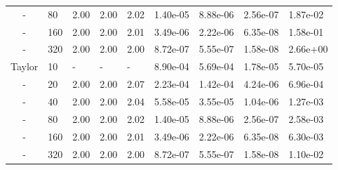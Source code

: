 \begin{table}[p]
{\begin{tabular}{cllllllll}
   - &    80 & 2.00 & 2.00 & 2.02 & 1.40e-05 & 8.88e-06 & 2.56e-07 & 1.87e-02 \\ 
   - &   160 & 2.00 & 2.00 & 2.01 & 3.49e-06 & 2.22e-06 & 6.35e-08 & 1.58e-01 \\ 
   - &   320 & 2.00 & 2.00 & 2.00 & 8.72e-07 & 5.55e-07 & 1.58e-08 & 2.66e+00 \\
   \hline
   Taylor &  10 & - & - & - & 8.90e-04 & 5.69e-04 & 1.78e-05 & 5.70e-05 \\ 
   - &   20 & 2.00 & 2.00 & 2.07 & 2.23e-04 & 1.42e-04 & 4.24e-06 & 6.96e-04 \\ 
   - &   40 & 2.00 & 2.00 & 2.04 & 5.58e-05 & 3.55e-05 & 1.04e-06 & 1.27e-03 \\ 
   - &   80 & 2.00 & 2.00 & 2.02 & 1.40e-05 & 8.88e-06 & 2.56e-07 & 2.58e-03 \\ 
   - &  160 & 2.00 & 2.00 & 2.01 & 3.49e-06 & 2.22e-06 & 6.35e-08 & 6.30e-03 \\ 
   - &  320 & 2.00 & 2.00 & 2.00 & 8.72e-07 & 5.55e-07 & 1.58e-08 & 1.10e-02 \\
   \hline
   \end{tabular}
   }
\end{table}

\clearpage

